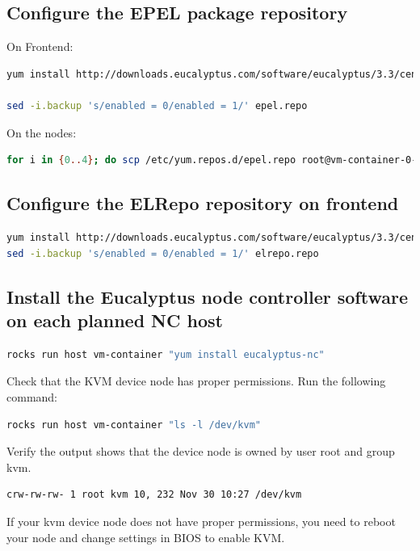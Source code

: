 \subsection{Configure the EPEL package repository}
On Frontend:
\begin{lstlisting}[language=bash]
yum install http://downloads.eucalyptus.com/software/eucalyptus/3.3/centos/6/x86_64/epel-release-6.noarch.rpm

sed -i.backup 's/enabled = 0/enabled = 1/' epel.repo
\end{lstlisting}

On the nodes:
\begin{lstlisting}[language=bash]
for i in {0..4}; do scp /etc/yum.repos.d/epel.repo root@vm-container-0-$i:/etc/yum.repos.d/epel.repo ; done
\end{lstlisting}

\subsection{Configure the ELRepo repository on frontend}
\begin{lstlisting}[language=bash]
yum install http://downloads.eucalyptus.com/software/eucalyptus/3.3/centos/6/x86_64/elrepo-release-6.noarch.rpm
sed -i.backup 's/enabled = 0/enabled = 1/' elrepo.repo
\end{lstlisting}

\subsection{Install the Eucalyptus node controller software on each planned NC host}
\begin{lstlisting}[language=bash]
rocks run host vm-container "yum install eucalyptus-nc"
\end{lstlisting}

Check that the KVM device node has proper permissions.
Run the following command:
\begin{lstlisting}[language=bash]
rocks run host vm-container "ls -l /dev/kvm"
\end{lstlisting}
Verify the output shows that the device node is owned by user root and group kvm.
\begin{lstlisting}[language=bash]
crw-rw-rw- 1 root kvm 10, 232 Nov 30 10:27 /dev/kvm
\end{lstlisting}

If your kvm device node does not have proper permissions, you need to reboot your node and change settings in BIOS to enable KVM.
\\ \linebreak
